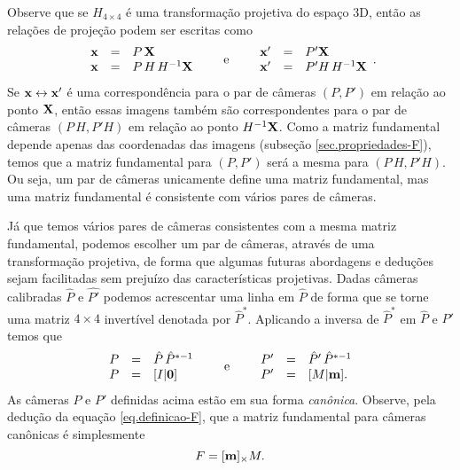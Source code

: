 Observe que se $H_{4\times4}$ é uma transformação projetiva do espaço 3D, então as relações de projeção podem ser escritas como
\begin{equation*}
\begin{array}{rcl}
\mathbf{x}&=&P\,\mathbf{X}\\
\mathbf{x}&=&P\,H\,H^{-1}\mathbf{X}
\end{array}\qquad\text{e}\qquad
\begin{array}{rcl}
\mathbf{x}'&=&P'\mathbf{X}\\
\mathbf{x}'&=&P'H\,H^{-1}\mathbf{X}
\end{array}.
\end{equation*} 
Se $\mathbf{x}\leftrightarrow\mathbf{x}'$ é uma correspondência para o par de câmeras $(P,P')$ em relação ao ponto $\mathbf{X}$, então essas imagens também são correspondentes para o par de câmeras $(P\,H,P'H)$ em relação ao ponto $H^{-1}\mathbf{X}$. Como a matriz fundamental depende apenas das coordenadas das imagens (subseção \ref{sec.propriedades-F}), temos que a matriz fundamental para $(P,P')$ será a mesma para $(P\,H,P'H)$. Ou seja, um par de câmeras unicamente define uma matriz fundamental, mas uma matriz fundamental é consistente com vários pares de câmeras.

Já que temos vários pares de câmeras consistentes com a mesma matriz fundamental, podemos escolher um par de câmeras, através de uma transformação projetiva, de forma que algumas futuras abordagens e deduções sejam facilitadas sem prejuízo das características projetivas. Dadas câmeras calibradas $\hat{P}$ e $\hat{P'}$ podemos acrescentar uma linha em $\hat{P}$ de forma que se torne uma matriz $4\times4$ invertível denotada por $\hat{P}^*$. Aplicando a inversa de $\hat{P}^*$ em $\hat{P}$ e $\hat{P}'$ temos que
\begin{equation*}
\begin{array}{rcl}
P&=&\hat{P}\,\hat{P}^{*-1}\\
P&=&[I|{\bf 0}]
\end{array}\qquad\text{e}\qquad
\begin{array}{rcl}
P'&=&\hat{P}'\,\hat{P}^{*-1}\\
P'&=&[M|{\bf m}].
\end{array}
\end{equation*}
As câmeras $P$ e $P'$ definidas acima estão em sua forma {\it canônica}. Observe, pela dedução da equação \ref{eq.definicao-F}, que a matriz fundamental para câmeras canônicas é simplesmente 
\begin{equation*}
F=[{\bf m}]_\times M.
\end{equation*}


